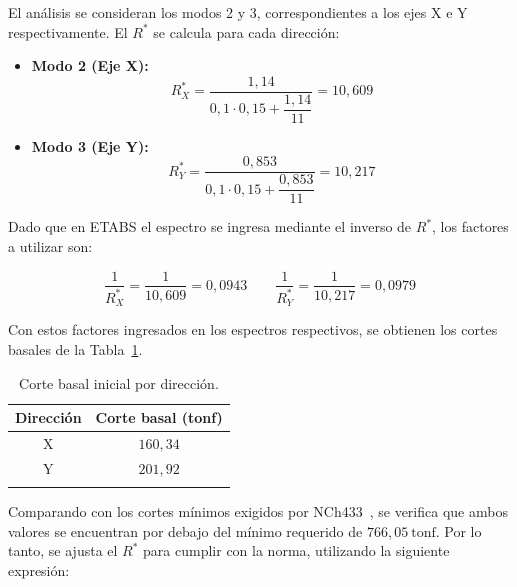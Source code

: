 El análisis se consideran los modos 2 y 3, correspondientes a los ejes X e Y 
respectivamente. El $R^*$ se calcula para cada dirección:

\begin{itemize}
    \item \textbf{Modo 2 (Eje X):}
    \begin{equation}
        R^*_X = \frac{1{,}14}{0{,}1 \cdot 0{,}15 + \dfrac{1{,}14}{11}} = 10{,}609
    \end{equation}

    \item \textbf{Modo 3 (Eje Y):}
    \begin{equation}
        R^*_Y = \frac{0{,}853}{0{,}1 \cdot 0{,}15 + \dfrac{0{,}853}{11}} = 10{,}217
    \end{equation}
\end{itemize}

Dado que en ETABS el espectro se ingresa mediante el inverso de $R^*$, los 
factores a utilizar son:

\begin{equation}
    \frac{1}{R^*_X} = \frac{1}{10{,}609} = 0{,}0943 \qquad
    \frac{1}{R^*_Y} = \frac{1}{10{,}217} = 0{,}0979
\end{equation}

Con estos factores ingresados en los espectros respectivos, se obtienen los cortes 
basales de la Tabla~\ref{tab:corte_basal_inicial}.

\begin{table}[H]
    \centering
    \caption{Corte basal inicial por dirección.}
    \label{tab:corte_basal_inicial}
    \begin{tabular}{cc}
        \toprule
        \textbf{Dirección} & \textbf{Corte basal (tonf)} \\
        \midrule
        X & $160{,}34$ \\
        Y & $201{,}92$ \\
        \bottomrule
        \vspace{0.001cm}
    \end{tabular}

\end{table}

Comparando con los cortes mínimos exigidos por NCh433~\cite{NCh433:1996}, se verifica 
que ambos valores se encuentran por debajo del mínimo requerido de $766{,}05\ \text{tonf}$. 
Por lo tanto, se ajusta el $R^*$ para cumplir con la norma, utilizando la siguiente 
expresión:

